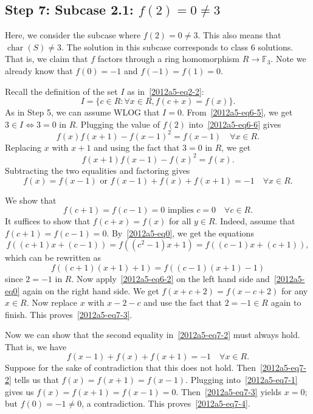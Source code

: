 \documentclass{article}
\newcommand{\F}{\mathbb{F}}
\DeclareMathOperator{\rchar}{char}
\begin{document}
\subsection*{Step 7: Subcase 2.1: $f(2) = 0 \neq 3$}

Here, we consider the subcase where $f(2) = 0 \neq 3$.
This also means that $\rchar(S) \neq 3$.
The solution in this subcase corresponds to class 6 solutions.
That is, we claim that $f$ factors through a ring homomorphism $R \to \F_3$.
Note we already know that $f(0) = -1$ and $f(-1) = f(1) = 0$.

Recall the definition of the set $I$ as in~\eqref{2012a5-eq2-2}:
\[ I = \{c \in R : \forall x \in R, f(c + x) = f(x)\}. \]
As in Step 5, we can assume WLOG that $I = 0$.
From~\eqref{2012a5-eq6-5}, we get $3 \in I \iff 3 = 0$ in $R$.
Plugging the value of $f(2)$ into~\eqref{2012a5-eq6-6} gives
\[ f(x) f(x + 1) - f(x - 1)^2 = f(x - 1) \quad \forall x \in R. \tag{7.1}\label{2012a5-eq7-1} \]
Replacing $x$ with $x + 1$ and using the fact that $3 = 0$ in $R$, we get
\[ f(x + 1) f(x - 1) - f(x)^2 = f(x). \]
Subtracting the two equalities and factoring gives
\[ f(x) = f(x - 1) \text{ or } f(x - 1) + f(x) + f(x + 1) = -1 \quad \forall x \in R. \tag{7.2}\label{2012a5-eq7-2} \]

We show that
\[ f(c + 1) = f(c - 1) = 0 \text{ implies } c = 0 \quad \forall c \in R. \tag{7.3}\label{2012a5-eq7-3} \]
It suffices to show that $f(c + x) = f(x)$ for all $y \in R$.
Indeed, assume that $f(c + 1) = f(c - 1) = 0$.
By~\eqref{2012a5-eq0}, we get the equations
\[ f((c + 1) x + (c - 1)) = f((c^2 - 1) x + 1) = f((c - 1) x + (c + 1)), \]
    which can be rewritten as
\[ f((c + 1)(x + 1) + 1) = f((c - 1)(x + 1) - 1) \]
    since $2 = -1$ in $R$.
Now apply~\eqref{2012a5-eq6-2} on the left hand side and~\eqref{2012a5-eq0} again on the right hand side.
We get $f(x + c + 2) = f(x - c + 2)$ for any $x \in R$.
Now replace $x$ with $x - 2 - c$ and use the fact that $2 = -1 \in R$ again to finish.
This proves~\eqref{2012a5-eq7-3}.

Now we can show that the second equality in~\eqref{2012a5-eq7-2} must always hold.
That is, we have
\[ f(x - 1) + f(x) + f(x + 1) = -1 \quad \forall x \in R. \tag{7.4}\label{2012a5-eq7-4} \]
Suppose for the sake of contradiction that this does not hold.
Then~\eqref{2012a5-eq7-2} tells us that $f(x) = f(x + 1) = f(x - 1)$.
Plugging into~\eqref{2012a5-eq7-1} gives us $f(x) = f(x + 1) = f(x - 1) = 0$.
Then~\eqref{2012a5-eq7-3} yields $x = 0$; but $f(0) = -1 \neq 0$, a contradiction.
This proves~\eqref{2012a5-eq7-4}.
\end{document}
